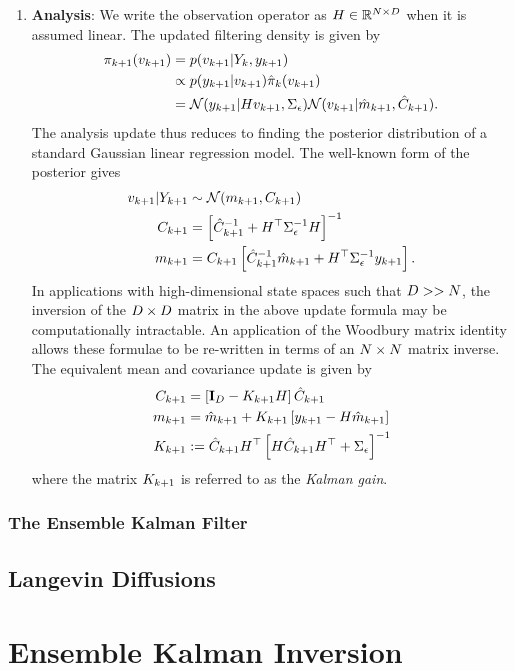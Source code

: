 \documentclass[12pt]{article}
\begin{document}
\begin{enumerate}
\item \textbf{Analysis}: We write the observation operator as $\obsOpLin \in \R^{\dimObs \times \dimState}$ when it is assumed linear. 
The updated filtering density is given by 
\begin{align*}
\filterDens[\timeStep+1](\dstate[\timeStep+1]) 
&= p(\dstate[\timeStep+1] | \dataObsCum, \ddataObs[\timeStep+1]) \\
&\propto p(\ddataObs[\timeStep+1] | \dstate[\timeStep+1]) \filterDensPred(\dstate[\timeStep+1]) \\
&= \Gaussian(\ddataObs[\timeStep+1] | \obsOpLin \dstate[\timeStep+1], \CovNoiseObs) \Gaussian(\dstate[\timeStep+1] | \stateMeanPred[\timeStep+1], \stateCovPred[\timeStep+1]).
\end{align*}
The analysis update thus reduces to finding the posterior distribution of a standard Gaussian linear regression model. The well-known form of the posterior gives 
\begin{align*}
\dstate[\timeStep+1] | \dataObsCum[\timeStep+1] &\sim \Gaussian(\stateMean[\timeStep+1], \stateCov[\timeStep+1]) \\
\stateCov[\timeStep+1] &= \left[\stateCovPred[\timeStep+1]^{-1} + \obsOpLin^\top \CovNoiseObs^{-1} \obsOpLin \right]^{-1} \\
\stateMean[\timeStep+1] &= \stateCov[\timeStep+1] \left[\stateCovPred[\timeStep+1]^{-1} \stateMeanPred[\timeStep+1] + \obsOpLin^\top \CovNoiseObs^{-1} \ddataObs[\timeStep+1] \right].
\end{align*}  
In applications with high-dimensional state spaces such that $\dimState >> \dimObs$, the inversion of the $\dimState \times \dimState$ matrix in the above update formula may be 
computationally intractable. An application of the Woodbury matrix identity allows these formulae to be re-written in terms of an $\dimObs \times \dimObs$ matrix inverse. 
The equivalent mean and covariance update is given by
\begin{align*}
\stateCov[\timeStep+1] &= \left[\idMat_{\dimState} - \KGain[\timeStep+1] \obsOpLin \right] \stateCovPred[\timeStep+1] \\
\stateMean[\timeStep+1] &= \stateMeanPred[\timeStep+1] + \KGain[\timeStep+1] \left[\ddataObs[\timeStep+1] - \obsOpLin \stateMeanPred[\timeStep+1] \right] \\
\KGain[\timeStep+1] &:= \stateCovPred[\timeStep+1] \obsOpLin^\top \left[\obsOpLin \stateCovPred[\timeStep+1] \obsOpLin^\top + \CovNoiseObs \right]^{-1}
\end{align*}
where the matrix $\KGain[\timeStep+1]$ is referred to as the \textit{Kalman gain}. 



\end{enumerate}






\subsubsection{The Ensemble Kalman Filter}


\subsection{Langevin Diffusions}

\section{Ensemble Kalman Inversion}
\end{document}

